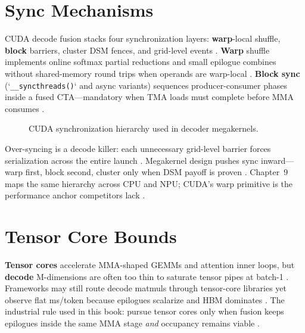 \section{Sync Mechanisms}
\label{sec:sync_mechanisms}

CUDA decode fusion stacks four synchronization layers: \textbf{warp}-local shuffle, \textbf{block} barriers, cluster DSM fences, and grid-level events \citep{nvidia2022hopper,semianalysis2024tma}.
\textbf{Warp} shuffle implements online softmax partial reductions and small epilogue combines without shared-memory round trips when operands are warp-local \citep{dao2022flashattention,patel2025llminference}.
\textbf{Block sync} (`\texttt{\_\_syncthreads()}` and async variants) sequences producer-consumer phases inside a fused CTA---mandatory when TMA loads must complete before MMA consumes \citep{nvidia2022hopper}.

\begin{figure}[t]
\centering
{}
\caption{CUDA synchronization hierarchy used in decoder megakernels.}
\label{fig:cuda_sync_levels}
\end{figure}

Over-syncing is a decode killer: each unnecessary grid-level barrier forces serialization across the entire launch \citep{taxbreak2026,patel2025llminference}.
Megakernel design pushes sync inward---warp first, block second, cluster only when DSM payoff is proven \citep{nvidia2022hopper}.
Chapter~9 maps the same hierarchy across CPU and NPU; CUDA's warp primitive is the performance anchor competitors lack \citep{patel2025llminference,amd2024xdna}.

\section{Tensor Core Bounds}
\label{sec:tensor_core_bounds}

\textbf{Tensor cores} accelerate MMA-shaped GEMMs and attention inner loops, but \textbf{decode} M-dimensions are often too thin to saturate tensor pipes at batch-1 \citep{patel2025llminference,memoryfloor2026,semianalysis2024tma}.
Frameworks may still route decode matmuls through tensor-core libraries yet observe flat ms/token because epilogues scalarize and HBM dominates \citep{memoryfloor2026,taxbreak2026}.
The industrial rule used in this book: pursue tensor cores only when fusion keeps epilogues inside the same MMA stage \emph{and} occupancy remains viable \citep{nvidia2022hopper,dao2022flashattention}.

